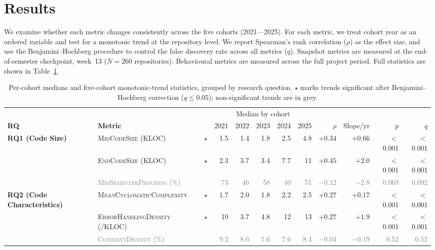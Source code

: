 \documentclass[sigconf,authorversion]{acmart}
\newcommand{\gray}[1]{\textcolor{gray}{#1}}
\begin{document}
\section{Results}\label{sec:results}
We examine whether each metric changes consistently across the five cohorts (2021---2025). For each metric, we treat cohort year as an ordered variable and test for a monotonic trend at the repository level. We report Spearman's rank correlation ($\rho$) as the effect size, and use the Benjamini--Hochberg procedure to control the false discovery rate across all metrics ($q$). Snapshot metrics are measured at the end-of-semester checkpoint, week~13 ($N=260$ repositories). 
Behavioural metrics are measured across the full project period. Full statistics are shown in Table~\ref{tab:trends}.

\begin{table}[t]\centering\small
\caption{Per-cohort medians and five-cohort monotonic-trend statistics, grouped by research question. $\star$ marks trends significant after Benjamini--Hochberg correction ($q \leq 0.05$); non-significant trends are in grey.}
\label{tab:trends}
\begin{tabular}{l l c rrrrr r r r r}
\toprule
 & & & \multicolumn{5}{c}{Median by cohort} & & & & \\ \cmidrule(lr){4-8}
\textbf{RQ} & \textbf{Metric} & & 2021 & 2022 & 2023 & 2024 & 2025 & $\rho$ & Slope/yr & $p$ & $q$ \\
\midrule
\multirow{3}{*}{\textbf{RQ1 (Code Size)}}
 & \textsc{MidCodeSize (KLOC)}            & $\star$ & 1.5 & 1.4 & 1.8 & 2.5 & 4.8 & $\mathbf{+0.34}$ & $+0.66$ & $<$0.001 & $<$0.001 \\
 & \textsc{EndCodeSize (KLOC)}            & $\star$ & 2.3 & 3.7 & 3.4 & 7.7 & 11 & $\mathbf{+0.45}$ & $+2.0$ & $<$0.001 & $<$0.001 \\
 & \gray{\textsc{MidSemesterProgress} (\%)} & & \gray{73} & \gray{46} & \gray{58} & \gray{40} & \gray{51} & \gray{$-0.12$} & \gray{$-2.8$} & \gray{0.069} & \gray{0.092} \\
\midrule
\multirow{3}{*}{\textbf{RQ2 (Code Characteristics)}}
 & \textsc{MeanCyclomaticComplexity} & $\star$         & 1.7 & 2.0 & 1.8 & 2.2 & 2.5 & $\mathbf{+0.27}$ & $+0.17$ & $<$0.001 & $<$0.001 \\
 & \textsc{ErrorHandlingDensity} (/KLOC) & $\star$ & 10 & 3.7 & 4.8 & 12 & 13 & $\mathbf{+0.27}$ & $+1.9$ & $<$0.001 & $<$0.001 \\
 & \gray{\textsc{CommentDensity} (\%)}         & & \gray{9.2} & \gray{8.6} & \gray{7.6} & \gray{7.6} & \gray{8.4} & \gray{$-0.04$} & \gray{$-0.19$} & \gray{0.52} & \gray{0.52} \\

\end{tabular}
\end{table}
\end{document}
